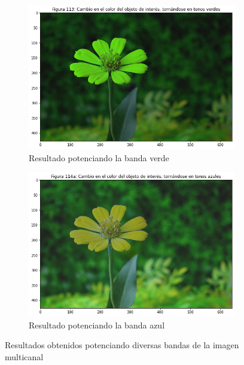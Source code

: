 \documentclass[11pt,twoside,titlepage,a4paper]{article}
\numberwithin{equation}{section} %
\theoremstyle{usual}
\begin{document}
\begin{figure}[h]
    \centering
    \begin{subfigure}[t]{.45\textwidth}
        \centering
        \includegraphics[width=\textwidth]{imagenes/PoissonImageEditing_cell_113_output_0.png}
        \caption{Resultado potenciando la banda verde}
        \label{fig:bandaVerdeFlor}
    \end{subfigure}
    \centering
    \begin{subfigure}[t]{.45\textwidth}
        \centering
        \includegraphics[width=\textwidth]{imagenes/PoissonImageEditing_cell_113_output_1.png}
        \caption{Resultado potenciando la banda azul}
        \label{fig:bandaAzulFlorIni}%
    \end{subfigure}
    \caption{Resultados obtenidos potenciando diversas bandas de la imagen multicanal}
    \label{fig:resultadosPotenciacionBandas}
\end{figure}
\end{document}
